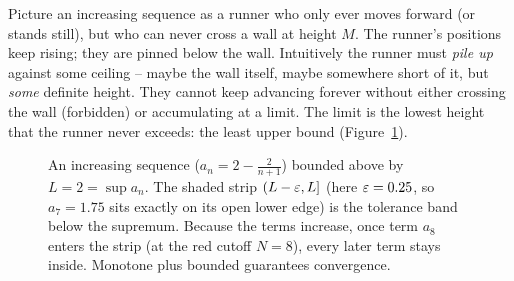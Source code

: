 \begin{intuitionbox}
Picture an increasing sequence as a runner who only ever moves forward (or stands
still), but who can never cross a wall at height $M$. The runner's positions keep
rising; they are pinned below the wall. Intuitively the runner must \emph{pile
up} against some ceiling -- maybe the wall itself, maybe somewhere short of it,
but \emph{some} definite height. They cannot keep advancing forever without
either crossing the wall (forbidden) or accumulating at a limit. The limit is the
lowest height that the runner never exceeds: the least upper bound
(Figure~\ref{ch28:fig-mct}).
\end{intuitionbox}

\begin{figure}[H]
\centering
{}
\caption{An increasing sequence ($a_n = 2 - \tfrac{2}{n+1}$) bounded above by
$L = 2 = \sup a_n$. The shaded strip $(L-\varepsilon, L]$ (here $\varepsilon = 0.25$, so $a_7 = 1.75$ sits exactly on its open lower edge) is the tolerance band below
the supremum. Because the terms increase, once term $a_8$ enters the strip
(at the red cutoff $N=8$), every later term stays inside.
Monotone plus bounded guarantees convergence.}
\label{ch28:fig-mct}
\end{figure}

